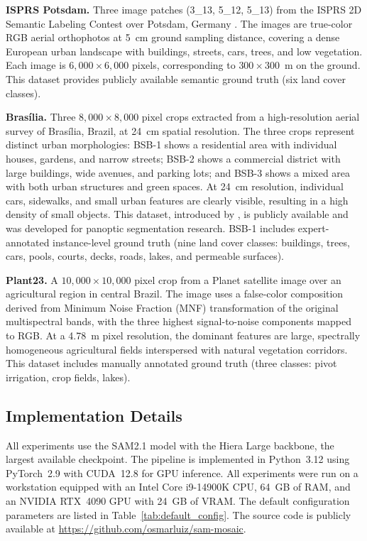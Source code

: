 \documentclass[review,11pt,authoryear]{elsarticle}
\begin{document}
\textbf{ISPRS Potsdam.} Three image patches (3\_13, 5\_12, 5\_13) from the ISPRS 2D Semantic Labeling Contest over Potsdam, Germany \citep{rottensteiner2014isprs}. The images are true-color RGB aerial orthophotos at 5~cm ground sampling distance, covering a dense European urban landscape with buildings, streets, cars, trees, and low vegetation. Each image is $6{,}000 \times 6{,}000$ pixels, corresponding to $300 \times 300$~m on the ground. This dataset provides publicly available semantic ground truth (six land cover classes).

\textbf{Bras\'{i}lia.} Three $8{,}000 \times 8{,}000$ pixel crops extracted from a high-resolution aerial survey of Bras\'{i}lia, Brazil, at 24~cm spatial resolution. The three crops represent distinct urban morphologies: BSB-1 shows a residential area with individual houses, gardens, and narrow streets; BSB-2 shows a commercial district with large buildings, wide avenues, and parking lots; and BSB-3 shows a mixed area with both urban structures and green spaces. At 24~cm resolution, individual cars, sidewalks, and small urban features are clearly visible, resulting in a high density of small objects. This dataset, introduced by \citet{carvalho2022panoptic}, is publicly available and was developed for panoptic segmentation research. BSB-1 includes expert-annotated instance-level ground truth (nine land cover classes: buildings, trees, cars, pools, courts, decks, roads, lakes, and permeable surfaces).

\textbf{Plant23.} A $10{,}000 \times 10{,}000$ pixel crop from a Planet satellite image \citep{frazier2021planet} over an agricultural region in central Brazil. The image uses a false-color composition derived from Minimum Noise Fraction (MNF) transformation \citep{green1988mnf} of the original multispectral bands, with the three highest signal-to-noise components mapped to RGB. At a 4.78~m pixel resolution, the dominant features are large, spectrally homogeneous agricultural fields interspersed with natural vegetation corridors. This dataset includes manually annotated ground truth (three classes: pivot irrigation, crop fields, lakes).

\subsection{Implementation Details}
\label{sec:exp_impl}

All experiments use the SAM2.1 model with the Hiera Large backbone, the largest available checkpoint. The pipeline is implemented in Python~3.12 using PyTorch~2.9 with CUDA~12.8 for GPU inference. All experiments were run on a workstation equipped with an Intel Core i9-14900K CPU, 64~GB of RAM, and an NVIDIA RTX~4090 GPU with 24~GB of VRAM. The default configuration parameters are listed in Table~\ref{tab:default_config}. The source code is publicly available at \url{https://github.com/osmarluiz/sam-mosaic}.
\end{document}
